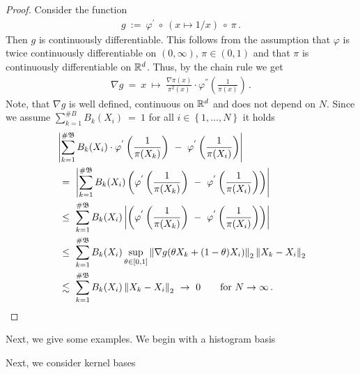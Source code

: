 \begin{proof}
  Consider the function 
  \begin{gather*}
  g
  \ 
  :=
  \ 
  \varphi^{'}
  \ 
  \circ 
  \ 
  (x\mapsto 1/x) 
  \ 
  \circ
  \ 
  \pi
  \,.
  \end{gather*}
  Then $g$ is continuously differentiable.
  This follows from the assumption that
  $\varphi$ is twice continuously differentiable on $(0,\infty)$, $\pi\in (0,1)$ and that $\pi$ is continuously differentiable on 
  $\mathbb{R}^d$.
  Thus, by the chain rule we get
  \begin{gather*}
   \nabla
   g
   \ 
   =
   \ 
   x
   \ 
   \mapsto
   \ 
   \frac{\nabla \pi(x)}{\pi^2(x)}
   \cdot
   \varphi^{''}\left( \frac{1}{\pi(x)} \right)
   \,.
  \end{gather*}
  Note, that $\nabla g$ is well defined, continuous on $\mathbb{R}^d$
  and does not depend on $N$.
  Since we assume
      $
      \sum_{k=1}^{\# B} 
      B_k(X_i)
      \ 
      =
      \ 
      1
      $
      for all 
      $i\in \left\{ 1,\ldots ,N \right\}$
      it holds
      \begin{align*}
   &
   \left| 
   \sum_{k=1}^{\# \mathfrak{B}} 
   B_k(X_i)
   \cdot
   \varphi^{'}
   \left( 
     \frac{1}{\pi(X_k)}
   \right)
   \ 
   -
   \ 
   \varphi^{'}
   \left( 
     \frac{1}{\pi(X_i)}
   \right)
   \right| 
   \\
   &
   \ 
   =
   \ 
   \left| 
   \sum_{k=1}^{\# \mathfrak{B}} 
   B_k(X_i)
   \left( 
   \varphi^{'}
   \left( 
     \frac{1}{\pi(X_k)}
   \right)
   \ 
   -
   \ 
   \varphi^{'}
   \left( 
     \frac{1}{\pi(X_i)}
   \right)
   \right)
   \right| 
\\
   &
   \ 
   \le
   \ 
   \sum_{k=1}^{\# \mathfrak{B}} 
   B_k(X_i)
   \left| 
   \left( 
   \varphi^{'}
   \left( 
     \frac{1}{\pi(X_k)}
   \right)
   \ 
   -
   \ 
   \varphi^{'}
   \left( 
     \frac{1}{\pi(X_i)}
   \right)
   \right)
   \right| 
\\
   &
   \ 
   \le
   \ 
   \sum_{k=1}^{\# \mathfrak{B}} 
   B_k(X_i)
   \sup_{\theta\in[0,1]}
   \norm{
     \nabla g
     (
     \theta X_k
     +
     (1-\theta)
     X_i
     )
   }_2
   \norm{X_k-X_i}_2
\\
   &
   \ 
   \lesssim
   \ 
   \sum_{k=1}^{\# \mathfrak{B}} 
   B_k(X_i)
   \norm{X_k-X_i}_2
   \ 
   \to
   \ 
   0
   \qquad
   \text{for}
   \ 
   N\to\infty
   \,.
      \end{align*}
\end{proof}

Next, we give some examples. 
We begin with a histogram basis \cite[§4]{Gyorfi2002}
\begin{example}

\end{example}

Next, we consider kernel bases \cite[§5]{Gyorfi2002}
\begin{example}

\end{example}
